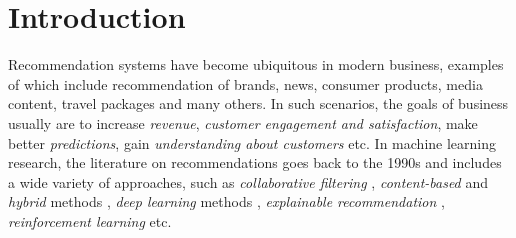 \section{Introduction}

Recommendation systems have become ubiquitous in modern business, 
examples of which include recommendation of brands, news, consumer products, media content, 
travel packages and many others. In such scenarios, the goals of business usually are to increase {\em revenue},
{\em customer engagement and satisfaction}, make better {\em predictions}, 
gain {\em understanding about customers} etc.
In machine learning research, the literature on recommendations goes back to the 1990s \cite{Tapestry, grouplens}
and includes a wide variety of approaches, such as {\em collaborative filtering} \cite{bell_lessons,koren2009matrix,SVD++,PMF}, 
{\em content-based} and {\em hybrid} methods \cite{rendle,ffm,bpr,pairwise,multiverse}, 
{\em deep learning} methods \cite{karatzoglou,PNN,cheng2016wide,lian2018xdeepfm,he2017neural,youtube,nvidia,survival},
 {\em explainable recommendation} \cite{explainable,rl_explainable}, {\em reinforcement learning} \cite{rl_explainable,rl,rl_negative} etc.


